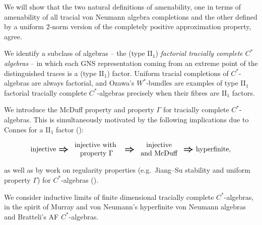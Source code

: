 \documentclass[a4paper,11pt]{amsart}
\theoremstyle{definition}
\numberwithin{equation}{section}
\numberwithin{theorem}{section}
\begin{document}
\begin{description}[leftmargin=\parindent, labelindent = 0cm]
\item[Amenability] We will show that the two natural definitions of amenability, one in terms of amenability of all tracial von Neumann algebra completions and the other defined by a uniform 2-norm version of the completely positive approximation property, agree.
\item[Factoriality] We identify a subclass of algebras -- the (type II$_1$) \emph{factorial tracially complete $C^*$algebras} -- in which each GNS representation coming from an extreme point of the distinguished traces is a (type II$_1$) factor. Uniform tracial completions of $C^*$-algebras are always factorial, and Ozawa's $W^*$-bundles are examples of type II$_1$ factorial tracially complete $C^*$-algebras precisely when their fibres are II$_1$ factors.
\item[Regularity] We introduce the McDuff property and property $\Gamma$ for tracially complete $C^*$-algebras. This is simultaneously motivated by the following implications due to Connes for a II$_1$ factor (\cite{Co76}):
\begin{equation*}
\begin{tikzcd}[column sep=3ex]
\textrm{injective}\ar[r,Rightarrow, 
line width=.3mm, double distance=.7mm] & \begin{array}{c}\text{injective with } \\ \text{property }\Gamma\end{array} \ar[r,Rightarrow, line width=.3mm, double distance=.7mm] & \begin{array}{c}\text{injective} \\ \text{and McDuff}\end{array}\ar[r,Rightarrow, line width=.3mm, double distance=.7mm] & \text{hyperfinite,}
\end{tikzcd}
\end{equation*}
as well as by work on regularity properties (e.g.\ Jiang--Su stability and uniform property $\Gamma$) for $C^*$-algebras (\cite{CETWW,CETW,Ro04,MS12}).
\item[Hyperfiniteness] We consider inductive limits of finite dimensional tracially complete $C^*$-algebras, in the spirit of Murray and von Neumann's hyperfinite von Neumann algebras and Bratteli's AF $C^*$-algebras. 


\end{description}
\end{document}
